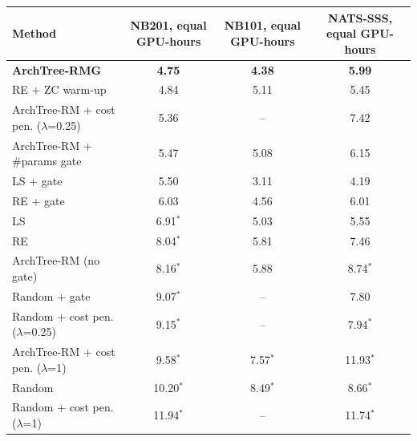 \begin{tabular}{@{}lccc@{}}
\toprule
Method & NB201, equal GPU-hours & NB101, equal GPU-hours & NATS-SSS, equal GPU-hours\\
\midrule
\textbf{ArchTree-RMG} & \textbf{4.75} & \textbf{4.38} & \textbf{5.99}\\
RE + ZC warm-up & 4.84 & 5.11 & 5.45\\
ArchTree-RM + cost pen. ($\lambda$=0.25) & 5.36 & -- & 7.42\\
ArchTree-RM + \#params gate & 5.47 & 5.08 & 6.15\\
LS + gate & 5.50 & 3.11 & 4.19\\
RE + gate & 6.03 & 4.56 & 6.01\\
LS & 6.91$^{*}$ & 5.03 & 5.55\\
RE & 8.04$^{*}$ & 5.81 & 7.46\\
ArchTree-RM (no gate) & 8.16$^{*}$ & 5.88 & 8.74$^{*}$\\
Random + gate & 9.07$^{*}$ & -- & 7.80\\
Random + cost pen. ($\lambda$=0.25) & 9.15$^{*}$ & -- & 7.94$^{*}$\\
ArchTree-RM + cost pen. ($\lambda$=1) & 9.58$^{*}$ & 7.57$^{*}$ & 11.93$^{*}$\\
Random & 10.20$^{*}$ & 8.49$^{*}$ & 8.66$^{*}$\\
Random + cost pen. ($\lambda$=1) & 11.94$^{*}$ & -- & 11.74$^{*}$\\
\bottomrule
\end{tabular}
